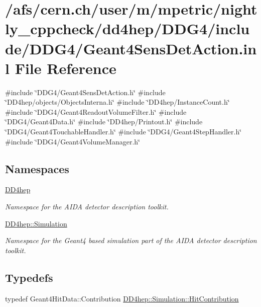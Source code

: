 \hypertarget{_geant4_sens_det_action_8inl}{}\section{/afs/cern.ch/user/m/mpetric/nightly\+\_\+cppcheck/dd4hep/\+D\+D\+G4/include/\+D\+D\+G4/\+Geant4\+Sens\+Det\+Action.inl File Reference}
\label{_geant4_sens_det_action_8inl}
{\ttfamily \#include \char`\"{}D\+D\+G4/\+Geant4\+Sens\+Det\+Action.\+h\char`\"{}}\newline
{\ttfamily \#include \char`\"{}D\+D4hep/objects/\+Objects\+Interna.\+h\char`\"{}}\newline
{\ttfamily \#include \char`\"{}D\+D4hep/\+Instance\+Count.\+h\char`\"{}}\newline
{\ttfamily \#include \char`\"{}D\+D\+G4/\+Geant4\+Readout\+Volume\+Filter.\+h\char`\"{}}\newline
{\ttfamily \#include \char`\"{}D\+D\+G4/\+Geant4\+Data.\+h\char`\"{}}\newline
{\ttfamily \#include \char`\"{}D\+D4hep/\+Printout.\+h\char`\"{}}\newline
{\ttfamily \#include \char`\"{}D\+D\+G4/\+Geant4\+Touchable\+Handler.\+h\char`\"{}}\newline
{\ttfamily \#include \char`\"{}D\+D\+G4/\+Geant4\+Step\+Handler.\+h\char`\"{}}\newline
{\ttfamily \#include \char`\"{}D\+D\+G4/\+Geant4\+Volume\+Manager.\+h\char`\"{}}\newline
\subsection*{Namespaces}
\begin{DoxyCompactItemize}
\item 
 \hyperlink{namespace_d_d4hep}{D\+D4hep}
\begin{DoxyCompactList}\small\item\em Namespace for the A\+I\+DA detector description toolkit. \end{DoxyCompactList}\item 
 \hyperlink{namespace_d_d4hep_1_1_simulation}{D\+D4hep\+::\+Simulation}
\begin{DoxyCompactList}\small\item\em Namespace for the Geant4 based simulation part of the A\+I\+DA detector description toolkit. \end{DoxyCompactList}\end{DoxyCompactItemize}
\subsection*{Typedefs}
\begin{DoxyCompactItemize}
\item 
typedef Geant4\+Hit\+Data\+::\+Contribution \hyperlink{namespace_d_d4hep_1_1_simulation_af3e4b03fc6b6e8a0ed0cba9dbf6c1f69}{D\+D4hep\+::\+Simulation\+::\+Hit\+Contribution}
\end{DoxyCompactItemize}

